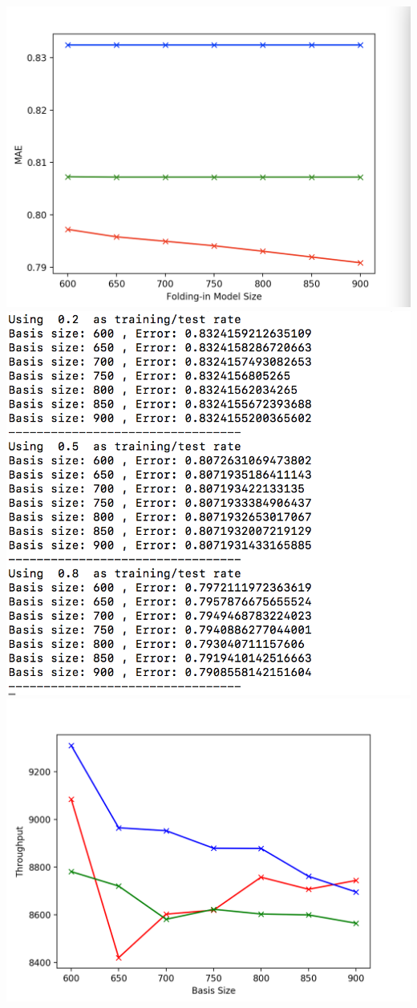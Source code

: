 \documentclass[11pt]{article}
\begin{document}
\begin{enumerate}
\includegraphics[width=0.7\columnwidth]{q7_result1}\\
\includegraphics[width=0.7\columnwidth]{q7_result2}\\
\includegraphics[width=0.7\columnwidth]{q7_result3}

\end{enumerate}
\end{document}
